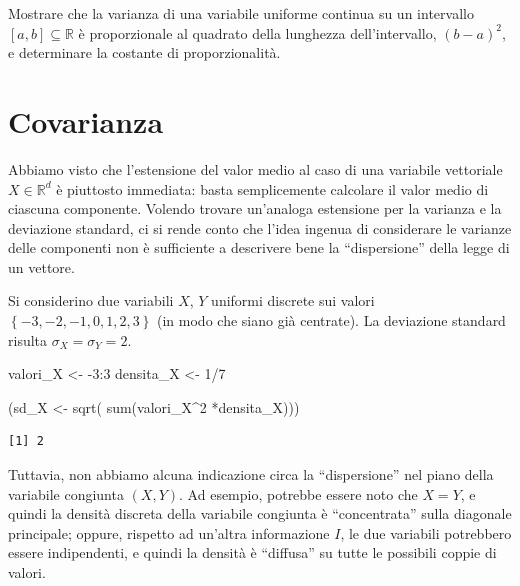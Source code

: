 \documentclass[
  italian,
  letterpaper,
]{book}
\newenvironment{Shaded}{\begin{snugshade}}{\end{snugshade}}
\newcommand{\DecValTok}[1]{\textcolor[rgb]{0.68,0.00,0.00}{#1}}
\newcommand{\FunctionTok}[1]{\textcolor[rgb]{0.28,0.35,0.67}{#1}}
\newcommand{\NormalTok}[1]{\textcolor[rgb]{0.00,0.23,0.31}{#1}}
\newcommand{\OtherTok}[1]{\textcolor[rgb]{0.00,0.23,0.31}{#1}}
\newcommand{\SpecialCharTok}[1]{\textcolor[rgb]{0.37,0.37,0.37}{#1}}
\newcommand{\cur}[1]{\left\{ #1 \right\}}
\newcommand{\R}{\mathbb{R}}
\theoremstyle{definition}
\theoremstyle{remark}
\begin{document}
Mostrare che la varianza di una variabile uniforme continua su un
intervallo \([a,b] \subseteq \R\) è proporzionale al quadrato della
lunghezza dell'intervallo, \((b-a)^2\), e determinare la costante di
proporzionalità.

\section{Covarianza}\label{sec-covarianza}

Abbiamo visto che l'estensione del valor medio al caso di una variabile
vettoriale \(X \in \R^d\) è piuttosto immediata: basta semplicemente
calcolare il valor medio di ciascuna componente. Volendo trovare
un'analoga estensione per la varianza e la deviazione standard, ci si
rende conto che l'idea ingenua di considerare le varianze delle
componenti non è sufficiente a descrivere bene la ``dispersione'' della
legge di un vettore.

Si considerino due variabili \(X\), \(Y\) uniformi discrete sui valori
\(\cur{-3,-2,-1,0,1,2,3}\) (in modo che siano già centrate). La
deviazione standard risulta \(\sigma_X =\sigma_Y = 2\).

\begin{Shaded}
\begin{Highlighting}[]
\NormalTok{valori\_X }\OtherTok{\textless{}{-}} \SpecialCharTok{{-}}\DecValTok{3}\SpecialCharTok{:}\DecValTok{3}
\NormalTok{densita\_X }\OtherTok{\textless{}{-}} \DecValTok{1}\SpecialCharTok{/}\DecValTok{7}

\NormalTok{(sd\_X }\OtherTok{\textless{}{-}} \FunctionTok{sqrt}\NormalTok{( }\FunctionTok{sum}\NormalTok{(valori\_X}\SpecialCharTok{\^{}}\DecValTok{2} \SpecialCharTok{*}\NormalTok{densita\_X)))}
\end{Highlighting}
\end{Shaded}

\begin{verbatim}
[1] 2
\end{verbatim}

Tuttavia, non abbiamo alcuna indicazione circa la ``dispersione'' nel
piano della variabile congiunta \((X,Y)\). Ad esempio, potrebbe essere
noto che \(X=Y\), e quindi la densità discreta della variabile congiunta
è ``concentrata'' sulla diagonale principale; oppure, rispetto ad
un'altra informazione \(I\), le due variabili potrebbero essere
indipendenti, e quindi la densità è ``diffusa'' su tutte le possibili
coppie di valori.
\end{document}
